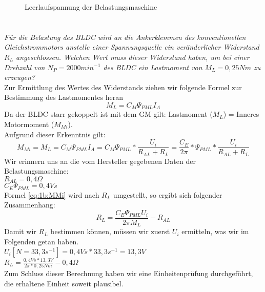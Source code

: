 \begin{figure}
	\centering
	
	\caption{Leerlaufspannung der Belastungsmaschine}
	\label{fig:1a:leerlauf}
\end{figure}



\section{}\label{sec:1b}
\textit{Für die Belastung des BLDC wird an die Ankerklemmen des konventionellen Gleichstrommotors anstelle einer Spannungsquelle ein veränderlicher Widerstand $ R_{L} $ angeschlossen. Welchen Wert muss dieser Widerstand haben, um bei einer Drehzahl von $ N_{P} = 2000 min^{-1} $ des BLDC ein Lastmoment von $ M_{L} = 0,25Nm $ zu erzeugen?}\\ Zur Ermittlung des Wertes des Widerstands ziehen wir folgende Formel zur Bestimmung des Lastmomentes heran
\begin{equation}
	M_{L} = C_{M}\Psi_{PML}I_{A}
\end{equation}
Da der BLDC starr gekoppelt ist mit dem GM gilt: Lastmoment ($ M_{L} $) = Inneres Motormoment ($ M_{Mi} $).\\
Aufgrund dieser Erkenntnis gilt:
\begin{equation}
	M_{Mi} = M_{L} = C_{M}\Psi_{PML}I_{A} = C_{M}\Psi_{PML}*\frac{U_{i}}{R_{AL}+R_{L}} = \frac{C_{E}}{2\pi}*\Psi_{PML}*\frac{U_{i}}{R_{AL}+R_{L}}
	\label{eq:1b:MMi}
\end{equation}
Wir erinnern uns an die vom Hersteller gegebenen Daten der Belastungsmaschine:\\
$ R_{AL} = 0,4\Omega $\\
$ C_{E}\Psi_{PML} = 0,4Vs $\\
Formel \ref{eq:1b:MMi} wird nach $R_{L}$ umgestellt, so ergibt sich folgender Zusammenhang:\\
\begin{equation}
	R_{L} = \frac{C_{E}\Psi_{PML}U_{i}}{2\pi M_{L}} - R_{AL}
\end{equation}
Damit wir $ R_{L} $  bestimmen können, müssen wir zuerst $ U_{i} $ ermitteln, was wir im Folgenden getan haben.\\
$ U_{i}[N=33,3s^{-1}] = 0,4Vs * 33,3s^{-1} = 13,3V $\\
$ R_{L} = \frac{0,4Vs * 13,3V}{2\pi * 0,25Nm} - 0,4\Omega $\\
Zum Schluss dieser Berechnung haben wir eine Einheitenprüfung durchgeführt, die erhaltene Einheit soweit plausibel.


